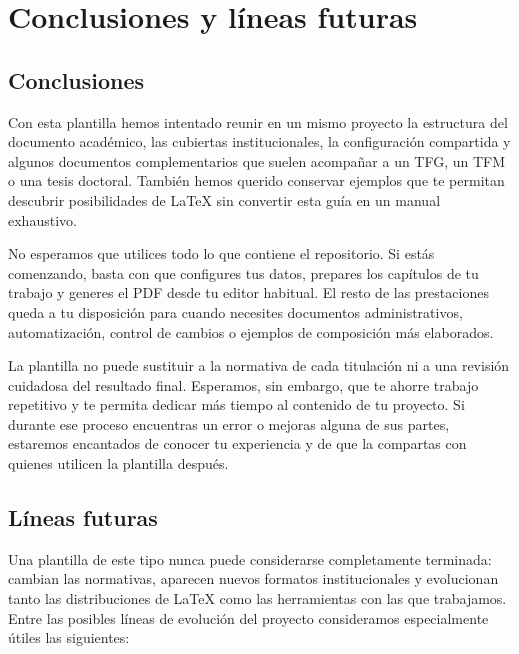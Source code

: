 %

\chapter{Conclusiones y líneas futuras}
\label{cha:conclusiones}

\section{Conclusiones}

Con esta plantilla hemos intentado reunir en un mismo proyecto la estructura del documento académico, las cubiertas institucionales, la configuración compartida y algunos documentos complementarios que suelen acompañar a un TFG, un TFM o una tesis doctoral. También hemos querido conservar ejemplos que te permitan descubrir posibilidades de \LaTeX{} sin convertir esta guía en un manual exhaustivo.

No esperamos que utilices todo lo que contiene el repositorio. Si estás comenzando, basta con que configures tus datos, prepares los capítulos de tu trabajo y generes el PDF desde tu editor habitual. El resto de las prestaciones queda a tu disposición para cuando necesites documentos administrativos, automatización, control de cambios o ejemplos de composición más elaborados.

La plantilla no puede sustituir a la normativa de cada titulación ni a una revisión cuidadosa del resultado final. Esperamos, sin embargo, que te ahorre trabajo repetitivo y te permita dedicar más tiempo al contenido de tu proyecto. Si durante ese proceso encuentras un error o mejoras alguna de sus partes, estaremos encantados de conocer tu experiencia y de que la compartas con quienes utilicen la plantilla después.

\section{Líneas futuras}

Una plantilla de este tipo nunca puede considerarse completamente terminada: cambian las normativas, aparecen nuevos formatos institucionales y evolucionan tanto las distribuciones de \LaTeX{} como las herramientas con las que trabajamos. Entre las posibles líneas de evolución del proyecto consideramos especialmente útiles las siguientes:

